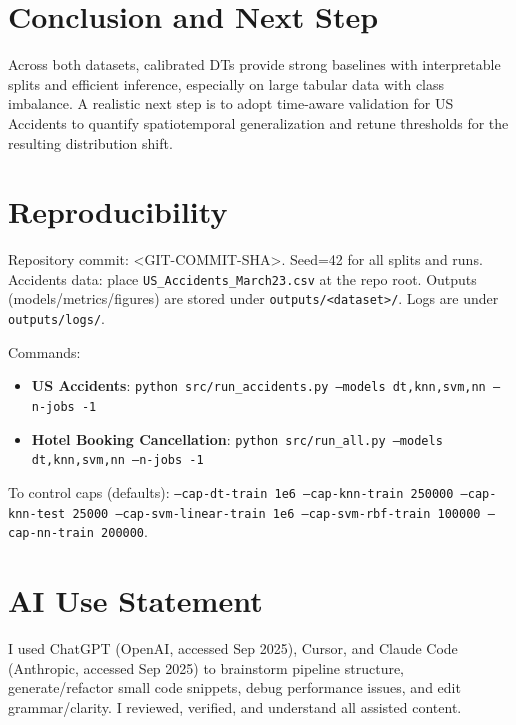 \documentclass[conference]{IEEEtran}
\newcommand{\datasetA}{Hotel Booking Cancellation}
\newcommand{\datasetB}{US Accidents}
\newcommand{\commitsha}{<GIT-COMMIT-SHA>}
\newcommand{\seed}{42}
\begin{document}
\section{Conclusion and Next Step}
Across both datasets, calibrated DTs provide strong baselines with interpretable splits and efficient inference, especially on large tabular data with class imbalance. A realistic next step is to adopt time-aware validation for \datasetB{} to quantify spatiotemporal generalization and retune thresholds for the resulting distribution shift.

\section*{Reproducibility}
Repository commit: \commitsha. Seed=\seed{} for all splits and runs. Accidents data: place \texttt{US\_Accidents\_March23.csv} at the repo root. Outputs (models/metrics/figures) are stored under \texttt{outputs/<dataset>/}. Logs are under \texttt{outputs/logs/}.

Commands:
\begin{itemize}
\item \textbf{\datasetB{}}: \texttt{python src/run\_accidents.py --models dt,knn,svm,nn --n-jobs -1}
\item \textbf{\datasetA{}}: \texttt{python src/run\_all.py --models dt,knn,svm,nn --n-jobs -1}
\end{itemize}
To control caps (defaults): \texttt{--cap-dt-train 1e6 --cap-knn-train 250000 --cap-knn-test 25000 --cap-svm-linear-train 1e6 --cap-svm-rbf-train 100000 --cap-nn-train 200000}.

\section*{AI Use Statement}
I used ChatGPT (OpenAI, accessed Sep 2025), Cursor, and Claude Code (Anthropic, accessed Sep 2025) to brainstorm pipeline structure, generate/refactor small code snippets, debug performance issues, and edit grammar/clarity. I reviewed, verified, and understand all assisted content.
\end{document}
